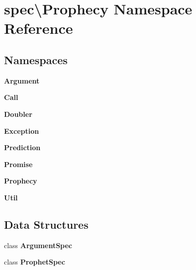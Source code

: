 \section{spec\textbackslash{}Prophecy Namespace Reference}
\label{namespacespec_1_1_prophecy}
\subsection*{Namespaces}
\begin{DoxyCompactItemize}
\item 
 {\bf Argument}
\item 
 {\bf Call}
\item 
 {\bf Doubler}
\item 
 {\bf Exception}
\item 
 {\bf Prediction}
\item 
 {\bf Promise}
\item 
 {\bf Prophecy}
\item 
 {\bf Util}
\end{DoxyCompactItemize}
\subsection*{Data Structures}
\begin{DoxyCompactItemize}
\item 
class {\bf Argument\+Spec}
\item 
class {\bf Prophet\+Spec}
\end{DoxyCompactItemize}
